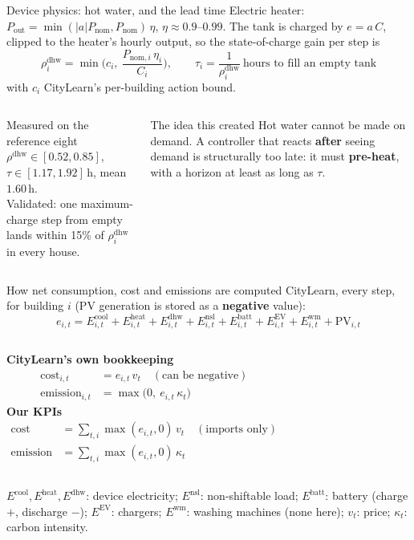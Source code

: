 \documentclass[aspectratio=169,10pt]{beamer}
\begin{document}
\begin{frame}{Device physics: hot water, and the lead time}
Electric heater: $P_{\text{out}} = \min(|a|P_{\text{nom}}, P_{\text{nom}})\,\eta$, $\eta \approx 0.9$--$0.99$. The tank is charged by $e = a\,C$, clipped to the heater's hourly output, so the state-of-charge gain per step is
\[
\boxed{\ \rho^{\text{dhw}}_i = \min\!\Big(c_i,\ \frac{P_{\text{nom},i}\,\eta_i}{C_i}\Big), \qquad \tau_i = \frac{1}{\rho^{\text{dhw}}_i}\ \text{hours to fill an empty tank}\ }
\]
with $c_i$ CityLearn's per-building action bound.
\vspace{0.3em}
\begin{columns}[T]
\begin{exampleblock}{Measured on the reference eight}
$\rho^{\text{dhw}} \in [0.52, 0.85]$, \quad $\tau \in [1.17, 1.92]$\,h, \quad mean $1.60$\,h.\\[2pt]
Validated: one maximum-charge step from empty lands within 15\% of $\rho^{\text{dhw}}_i$ in every house.
\end{exampleblock}
\begin{block}{The idea this created}
Hot water cannot be made on demand. A controller that reacts \textbf{after} seeing demand is structurally too late: it must \textbf{pre-heat}, with a horizon at least as long as $\tau$.
\end{block}
\end{columns}
\end{frame}

\begin{frame}{How net consumption, cost and emissions are computed}
CityLearn, every step, for building $i$ (PV generation is stored as a \textbf{negative} value):
\[
e_{i,t} = E^{\text{cool}}_{i,t} + E^{\text{heat}}_{i,t} + E^{\text{dhw}}_{i,t} + E^{\text{nsl}}_{i,t} + E^{\text{batt}}_{i,t} + E^{\text{EV}}_{i,t} + E^{\text{wm}}_{i,t} + \mathrm{PV}_{i,t}
\]
\begin{columns}[T]
\textbf{CityLearn's own bookkeeping}
\begin{align*}
\text{cost}_{i,t} &= e_{i,t}\, v_t \quad(\text{can be negative})\\
\text{emission}_{i,t} &= \max\big(0,\ e_{i,t}\,\kappa_t\big)
\end{align*}
\textbf{Our KPIs}
\begin{align*}
\text{cost} &= \textstyle\sum_{t,i} \max(e_{i,t},0)\, v_t \quad(\text{imports only})\\
\text{emission} &= \textstyle\sum_{t,i} \max(e_{i,t},0)\, \kappa_t
\end{align*}
\end{columns}
\vspace{0.3em}
\small $E^{\text{cool}}, E^{\text{heat}}, E^{\text{dhw}}$: device electricity; $E^{\text{nsl}}$: non-shiftable load; $E^{\text{batt}}$: battery (charge $+$, discharge $-$); $E^{\text{EV}}$: chargers; $E^{\text{wm}}$: washing machines (none here); $v_t$: price; $\kappa_t$: carbon intensity.
\end{frame}
\end{document}
